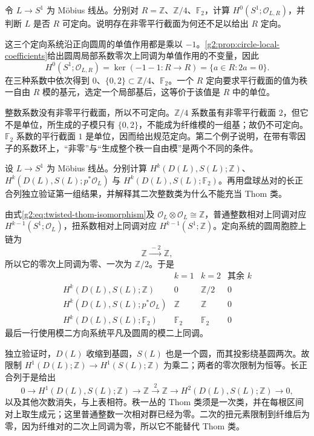 \begin{exercise}\label{g2:ex:orientation-over-z-four}
	令 \(L\to S^1\) 为 Möbius 线丛。分别对 \(R=\mathbb Z\)、\(\mathbb Z/4\)、\(\mathbb F_2\)，计算 \(H^0(S^1;\mathcal O_{L,R})\)，并判断 \(L\) 是否 \(R\) 可定向。说明存在非零平行截面为何还不足以给出 \(R\) 定向。
\end{exercise}
\begin{solution}
	这三个定向系统沿正向圆周的单值作用都是乘以 \(-1\)。\cref{g2:prop:circle-local-coefficients}给出圆周局部系数零次上同调为单值作用的不变量，因此
	\[
		H^0(S^1;\mathcal O_{L,R})=\ker(-1-1:R\longrightarrow R)=\{a\in R:2a=0\}.
	\]
	在三种系数中依次得到 \(0\)、\(\{0,2\}\subset\mathbb Z/4\)、\(\mathbb F_2\)。一个 \(R\) 定向要求平行截面的值为秩一自由 \(R\) 模的基元，选定一个局部基后，这等价于该值是 \(R\) 中的单位。

	整数系数没有非零平行截面，所以不可定向。\(\mathbb Z/4\) 系数虽有非零平行截面 \(2\)，但它不是单位，所生成的子模只有 \(\{0,2\}\)，不能成为纤维模的一组基；故仍不可定向。\(\mathbb F_2\) 系数的平行截面 \(1\) 是单位，因而给出规范定向。第二个例子说明，在带有零因子的系数环上，“非零”与“生成整个秩一自由模”是两个不同的条件。
\end{solution}

\begin{exercise}\label{g2:ex:mobius-thom-cohomology}
	设 \(L\to S^1\) 为 Möbius 线丛。分别计算 \(H^k(D(L),S(L);\mathbb Z)\)、\(H^k(D(L),S(L);p^*\mathcal O_L)\) 与 \(H^k(D(L),S(L);\mathbb F_2)\)。再用盘球丛对的长正合列独立验证第一组结果，并解释其二次整数类为什么不能充当 Thom 类。
\end{exercise}
\begin{solution}
	由式\eqref{g2:eq:twisted-thom-isomorphism}及 \(\mathcal O_L\otimes\mathcal O_L\cong\mathbb Z\)，普通整数相对上同调对应 \(H^{k-1}(S^1;\mathcal O_L)\)，扭系数相对上同调对应 \(H^{k-1}(S^1;\mathbb Z)\)。定向系统的圆周胞腔上链为
	\[
		\mathbb Z\xrightarrow{\,-2\,}\mathbb Z,
	\]
	所以它的零次上同调为零、一次为 \(\mathbb Z/2\)。于是
	\[
	\begin{array}{c|ccc}
		&k=1&k=2&\text{其余 }k\\\hline
		H^k(D(L),S(L);\mathbb Z)&0&\mathbb Z/2&0\\
		H^k(D(L),S(L);p^*\mathcal O_L)&\mathbb Z&\mathbb Z&0\\
		H^k(D(L),S(L);\mathbb F_2)&\mathbb F_2&\mathbb F_2&0
	\end{array}
	\]
	最后一行使用模二方向系统平凡及圆周的模二上同调。

	独立验证时，\(D(L)\) 收缩到基圆，\(S(L)\) 也是一个圆，而其投影绕基圆两次。故限制 \(H^1(D(L);\mathbb Z)\to H^1(S(L);\mathbb Z)\) 为乘二；两者的零次限制为恒等。长正合列于是给出
	\[
		0\longrightarrow H^1(D(L),S(L);\mathbb Z)\longrightarrow\mathbb Z
		\xrightarrow{\,2\,}\mathbb Z\longrightarrow H^2(D(L),S(L);\mathbb Z)\longrightarrow0,
	\]
	以及其他次数消失，与上表相符。秩一丛的 Thom 类须是一次类，并在每根区间对上取生成元；这里普通整数一次相对群已经为零。二次的扭元素限制到纤维后为零，因为纤维对的二次上同调为零，所以它不能替代 Thom 类。
\end{solution}

